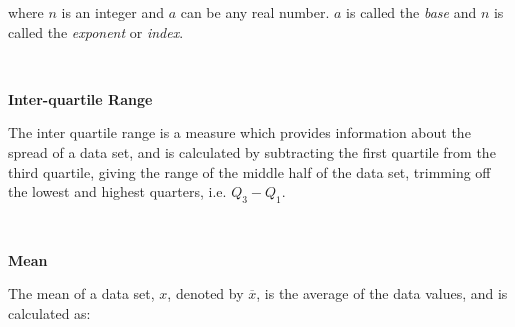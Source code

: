 \begin{description}
\begin{description}
      \label{m38359*id62692}where $n$ is an integer and $a$ can be any real number. $a$ is called the \textsl{base} and $n$ is called the \textsl{exponent} or \textsl{index}. \par 
      \\\end{description}
	    \vspace{.3cm}
	    \item[{\large \bfseries I}]\noindent\raggedright
	    {\bf  Inter-quartile Range }\\\begin{description}\item{\hspace{.3cm}}\hspace{.3cm}
          \label{m39400*id214019}The inter quartile range is a measure which provides information about the spread of a data set, and is calculated by subtracting the first quartile from the third quartile, giving the range of the middle half of the data set, trimming off the lowest and highest quarters, i.e. ${Q}_{3}-{Q}_{1}$. \par 
          \\\end{description}
	    \vspace{.3cm}
	    \item[{\large \bfseries M}]\noindent\raggedright
	    {\bf  Mean }\\\begin{description}\item{\hspace{.3cm}}\hspace{.3cm}
          \label{m39400*id211228}The mean of a data set, $x$, denoted by $\overline{x}$, is the average of the data values, and is calculated as:\par 
          \label{m39400*uid61}\nopagebreak\noindent{}
\end{description}
\end{description}
